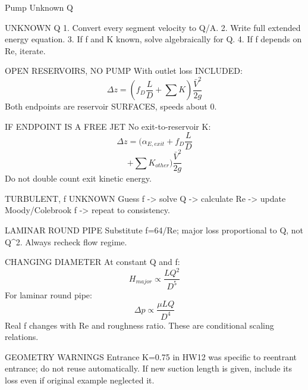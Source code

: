 Pump Unknown Q

UNKNOWN Q
1. Convert every segment velocity to Q/A.
2. Write full extended energy equation.
3. If f and K known, solve algebraically for Q.
4. If f depends on Re, iterate.

OPEN RESERVOIRS, NO PUMP
With outlet loss INCLUDED:
$$\Delta z=(f_D\frac{L}{D}+\sum K)\frac{\bar V^2}{2g}$$
Both endpoints are reservoir SURFACES, speeds about 0.

IF ENDPOINT IS A FREE JET
No exit-to-reservoir K:
$$\Delta z=(\alpha_{E,exit}+f_D\frac{L}{D}$$
$$+\sum K_{other})\frac{\bar V^2}{2g}$$
Do not double count exit kinetic energy.

TURBULENT, f UNKNOWN
Guess f -> solve Q -> calculate Re -> update Moody/Colebrook f -> repeat to consistency.

LAMINAR ROUND PIPE
Substitute f=64/Re; major loss proportional to Q, not Q^2.
Always recheck flow regime.

CHANGING DIAMETER
At constant Q and f:
$$H_{major}\propto\frac{LQ^2}{D^5}$$
For laminar round pipe:
$$\Delta p\propto\frac{\mu LQ}{D^4}$$
Real f changes with Re and roughness ratio. These are conditional scaling relations.

GEOMETRY WARNINGS
Entrance K=0.75 in HW12 was specific to reentrant entrance; do not reuse automatically.
If new suction length is given, include its loss even if original example neglected it.
